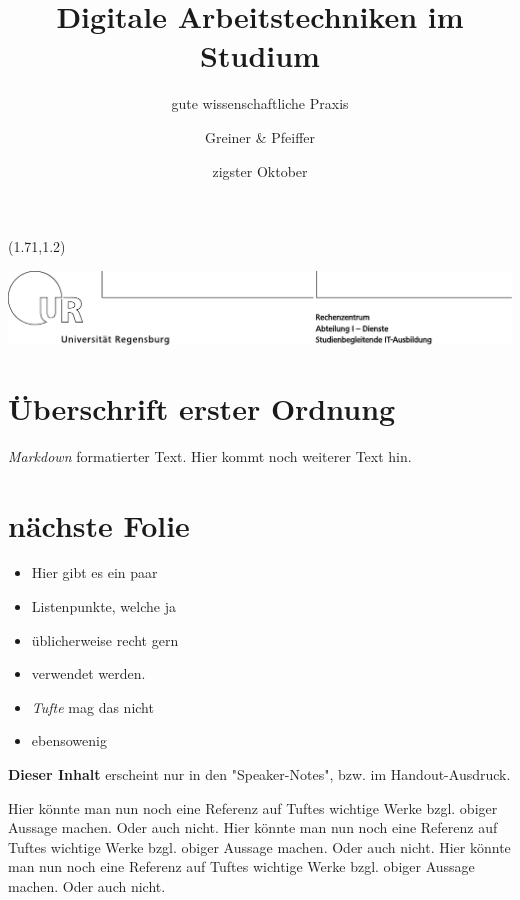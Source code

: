 \documentclass[ngerman,a4,footexclude,headinclude,DIV=9]{scrartcl}
\title{Digitale Arbeitstechniken im Studium}
\subtitle{gute wissenschaftliche Praxis}
\author{Greiner \& Pfeiffer}
\date{zigster Oktober}
\begin{document}
\maketitle

\setlength{\TPHorizModule}{1cm}

\setlength{\TPVertModule}{\TPHorizModule}

\begin{textblock}{4}(1.71,1.2)

\includegraphics[scale=0.9]{Template/TEX-PDF/logo-uni-rz-stud-it-regular}

\end{textblock}

{
\hypersetup{linkcolor=black}
\setcounter{tocdepth}{3}
\tableofcontents
\pagebreak
\clearpage
}
\section{Überschrift erster
Ordnung}\label{uxfcberschrift-erster-ordnung}

\emph{Markdown} formatierter Text. Hier kommt noch weiterer Text hin.

\section{nächste Folie}\label{nuxe4chste-folie}

\begin{itemize}
\itemsep1pt\parskip0pt
\item
  Hier gibt es ein paar
\item
  Listenpunkte, welche ja
\item
  üblicherweise recht gern
\item
  verwendet werden.
\item
  \emph{Tufte} mag das nicht
\item
  ebensowenig \textcite[22-26]{dotzler:2008}
\end{itemize}

\textbf{Dieser Inhalt} erscheint nur in den "Speaker-Notes", bzw. im
Handout-Ausdruck.

Hier könnte man nun noch eine Referenz auf Tuftes wichtige Werke bzgl.
obiger Aussage machen. Oder auch nicht. Hier könnte man nun noch eine
Referenz auf Tuftes wichtige Werke bzgl. obiger Aussage machen. Oder
auch nicht. Hier könnte man nun noch eine Referenz auf Tuftes wichtige
Werke bzgl. obiger Aussage machen. Oder auch nicht.
\end{document}
